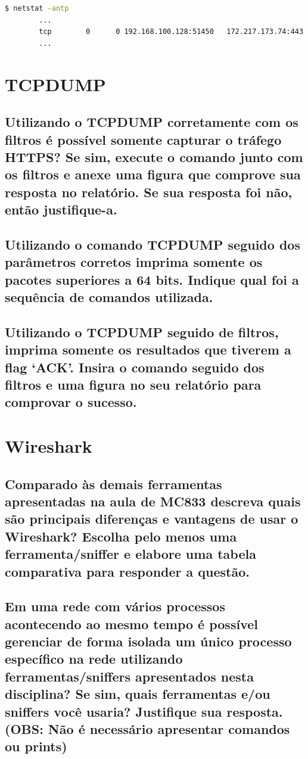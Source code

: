\documentclass[12pt,a4paper]{report}
\begin{document}
\begin{lstlisting}[language=bash]
        $ netstat -antp   
        ...
        tcp        0      0 192.168.100.128:51450   172.217.173.74:443      ESTABLISHED 25502/chrome --type 
        ...
\end{lstlisting}


\section{TCPDUMP}
\subsection{Utilizando o TCPDUMP corretamente com os filtros é possível somente capturar o tráfego HTTPS? Se sim, execute o comando junto com os filtros e anexe uma figura que comprove sua resposta no relatório. Se sua resposta foi não, então justifique-a.}
\subsection{Utilizando o comando TCPDUMP seguido dos parâmetros corretos imprima somente os pacotes superiores a 64 bits. Indique qual foi a sequência de comandos utilizada.}
\subsection{Utilizando o TCPDUMP seguido de filtros, imprima somente os resultados que tiverem a flag ‘ACK’. Insira o comando seguido dos filtros e uma figura no seu relatório para comprovar o sucesso.}

\section{Wireshark}


\subsection{Comparado às demais ferramentas apresentadas na aula de MC833 descreva quais são principais diferenças e vantagens de usar o Wireshark? Escolha pelo menos uma ferramenta/sniffer e elabore uma tabela comparativa para responder a questão.}

\subsection{Em uma rede com vários processos acontecendo ao mesmo tempo é possível gerenciar de forma isolada um único processo específico na rede utilizando ferramentas/sniffers apresentados nesta disciplina? Se sim, quais ferramentas e/ou sniffers você usaria? Justifique sua resposta. (OBS: Não é necessário apresentar comandos ou prints)}
\end{document}
